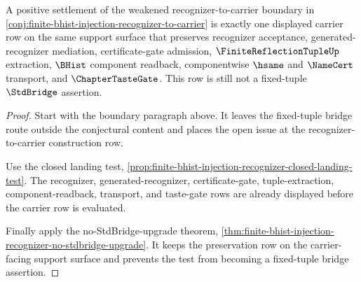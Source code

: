 \begin{theorem}
\label{thm:finite-bhist-injection-carrier-row-positive-settlement-test}
A positive settlement of the weakened recognizer-to-carrier boundary in \autoref{conj:finite-bhist-injection-recognizer-to-carrier} is exactly one displayed carrier row on the same support surface that preserves recognizer acceptance, generated-recognizer mediation, certificate-gate admission, $\FiniteReflectionTupleUp$ extraction, $\BHist$ component readback, componentwise $\hsame$ and $\NameCert$ transport, and $\ChapterTasteGate$. This row is still not a fixed-tuple $\StdBridge$ assertion.
\end{theorem}
\begin{proof}
Start with the boundary paragraph above. It leaves the fixed-tuple bridge route outside the conjectural content and places the open issue at the recognizer-to-carrier construction row.

Use the closed landing test, \autoref{prop:finite-bhist-injection-recognizer-closed-landing-test}. The recognizer, generated-recognizer, certificate-gate, tuple-extraction, component-readback, transport, and taste-gate rows are already displayed before the carrier row is evaluated.

Finally apply the no-StdBridge-upgrade theorem, \autoref{thm:finite-bhist-injection-recognizer-no-stdbridge-upgrade}. It keeps the preservation row on the carrier-facing support surface and prevents the test from becoming a fixed-tuple bridge assertion.
\end{proof}

